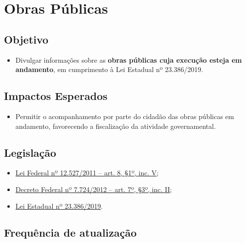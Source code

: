 \documentclass[
]{book}
\providecommand{\tightlist}{%
  \setlength{\itemsep}{0pt}\setlength{\parskip}{0pt}}
\begin{document}
\hypertarget{obras-puxfablicas}{%
\section{Obras Públicas}\label{obras-puxfablicas}}

\hypertarget{objetivo-3}{%
\subsection{Objetivo}\label{objetivo-3}}

\begin{itemize}
\tightlist
\item
  Divulgar informações sobre as \textbf{obras públicas cuja execução esteja em andamento}, em cumprimento à Lei Estadual nº 23.386/2019.
\end{itemize}

\hypertarget{impactos-esperados-4}{%
\subsection{Impactos Esperados}\label{impactos-esperados-4}}

\begin{itemize}
\tightlist
\item
  Permitir o acompanhamento por parte do cidadão das obras públicas em andamento, favorecendo a fiscalização da atividade governamental.
\end{itemize}

\hypertarget{legislauxe7uxe3o-4}{%
\subsection{Legislação}\label{legislauxe7uxe3o-4}}

\begin{itemize}
\tightlist
\item
  \href{http://www.planalto.gov.br/ccivil_03/_ato2011-2014/2011/lei/l12527.htm\#art8}{Lei Federal nº 12.527/2011 -- art. 8, §1º, inc. V};
\item
  \href{http://www.planalto.gov.br/ccivil_03/_ato2011-2014/2012/decreto/d7724.htm\#art7}{Decreto Federal nº 7.724/2012 -- art. 7º, §3º, inc. II};
\item
  \href{https://www.almg.gov.br/consulte/legislacao/completa/completa.html?tipo=LEI\&num=23386\&comp=\&ano=2019}{Lei Estadual nº 23.386/2019}.
\end{itemize}

\hypertarget{frequuxeancia-de-atualizauxe7uxe3o-3}{%
\subsection{Frequência de atualização}\label{frequuxeancia-de-atualizauxe7uxe3o-3}}
\end{document}
